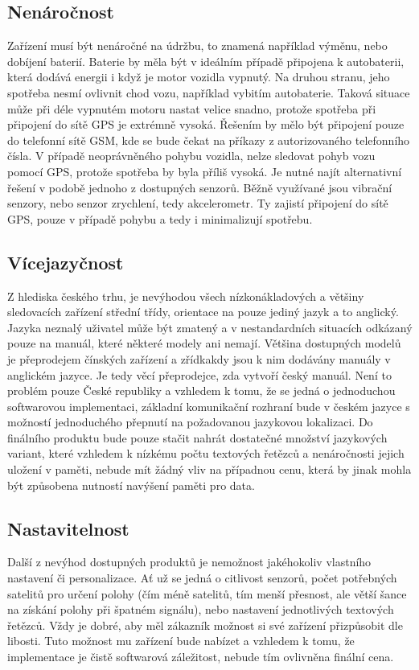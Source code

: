 \documentclass[FM,BP]{tulthesis}  %
\begin{document}
\subsection{Nenáročnost}
Zařízení musí být nenáročné na údržbu, to znamená například výměnu, nebo dobíjení baterií. Baterie by měla být v ideálním případě připojena k autobaterii, která dodává energii i když je motor vozidla vypnutý. Na druhou stranu, jeho spotřeba nesmí ovlivnit chod vozu, například vybitím autobaterie. Taková situace může při déle vypnutém motoru nastat velice snadno, protože spotřeba při připojení do sítě GPS je extrémně vysoká. Řešením by mělo být připojení pouze do telefonní sítě GSM, kde se bude čekat na příkazy z autorizovaného telefonního čísla. V případě neoprávněného pohybu vozidla, nelze sledovat pohyb vozu pomocí GPS, protože spotřeba by byla příliš vysoká. Je nutné najít alternativní řešení v podobě jednoho z dostupných senzorů. Běžně využívané jsou vibrační senzory, nebo senzor zrychlení, tedy akcelerometr. Ty zajistí připojení do sítě GPS, pouze v případě pohybu a tedy i minimalizují spotřebu.

\subsection{Vícejazyčnost}
Z hlediska českého trhu, je nevýhodou všech nízkonákladových a většiny sledovacích zařízení střední třídy, orientace na pouze jediný jazyk a to anglický. Jazyka neznalý uživatel může být zmatený a v nestandardních situacích odkázaný pouze na manuál, které některé modely ani nemají. Většina dostupných modelů je přeprodejem čínských zařízení a zřídkakdy jsou k nim dodávány manuály v anglickém jazyce. Je tedy věcí přeprodejce, zda vytvoří český manuál. Není to problém pouze České republiky a vzhledem k tomu, že se jedná o jednoduchou softwarovou implementaci, základní komunikační rozhraní bude v českém jazyce s možností jednoduchého přepnutí na požadovanou jazykovou lokalizaci. Do finálního produktu bude pouze stačit nahrát dostatečné množství jazykových variant, které vzhledem k nízkému počtu textových řetězců a nenáročnosti jejich uložení v paměti, nebude mít žádný vliv na případnou cenu, která by jinak mohla být způsobena nutností navýšení paměti pro data.

\subsection{Nastavitelnost}
Další z nevýhod dostupných produktů je nemožnost jakéhokoliv vlastního nastavení či personalizace. Ať už se jedná o citlivost senzorů, počet potřebných satelitů pro určení polohy (čím méně satelitů, tím menší přesnost, ale větší šance na získání polohy při špatném signálu), nebo nastavení jednotlivých textových řetězců. Vždy je dobré, aby měl zákazník možnost si své zařízení přizpůsobit dle libosti. Tuto možnost mu zařízení bude nabízet a vzhledem k tomu, že implementace je čistě softwarová záležitost, nebude tím ovlivněna finální cena.
\end{document}

